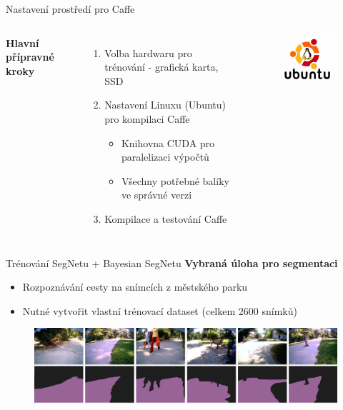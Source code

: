 \documentclass[aspectratio=1610]{beamer}
\begin{document}
\begin{frame}{Nastavení prostředí pro Caffe}
	\begin{columns}[T]
    { 		
		\textbf{Hlavní přípravné kroky}
		\begin{enumerate}
			\item Volba hardwaru pro trénování - grafická karta, SSD
			\item Nastavení Linuxu (Ubuntu) pro kompilaci Caffe
			\begin{itemize}
				\item Knihovna CUDA pro paralelizaci výpočtů
				\item Všechny potřebné balíky ve správné verzi
			\end{itemize}
			\item Kompilace a testování Caffe					
		\end{enumerate}
	}
	\begin{figure}[h]
		\centering
			\includegraphics[width=4cm, keepaspectratio]{ubuntu.jpg}			
	\end{figure}
	\end{columns}
\end{frame}
\begin{frame}{Trénování SegNetu + Bayesian SegNetu}
\textbf{Vybraná úloha pro segmentaci}
	\begin{itemize}
		\item Rozpoznávání cesty na snímcích z městského parku
		\item Nutné vytvořit vlastní trénovací dataset (celkem 2600 snímků)
	\end{itemize}
	\vspace{5mm}
	\begin{figure}[h]
	\centering
	\includegraphics[width=13cm, keepaspectratio]{result.png}			
	\end{figure}	
\end{frame}
\end{document}
